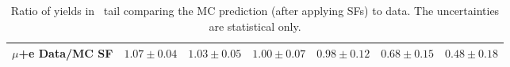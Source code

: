 \begin{table}[!h]
\begin{center}
{\begin{tabular}{l||c||c|c|c|c|c}
\hline
$\mu$+e Data/MC SF 		  & $1.07 \pm 0.04$ & $1.03 \pm 0.05$ & $1.00 \pm 0.07$ & $0.98 \pm 0.12$ & $0.68 \pm 0.15$ & $0.48 \pm 0.18$ \\
\hline
\end{tabular}}
\caption{ Ratio of yields in \mt\ tail comparing the MC prediction (after
  applying SFs) to data. The uncertainties are statistical only.
\label{tab:hugecr5yields}}
\end{center}
\end{table}

